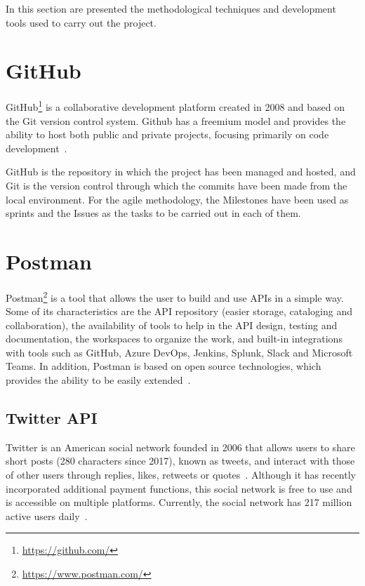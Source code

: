 
\nonzeroparskip In this section are presented the methodological techniques and development tools used to carry out the project.

\section{GitHub}

\nonzeroparskip GitHub\footnote{\url{https://github.com/}} is a collaborative development platform created in 2008 and based on the Git version control system. Github has a freemium model and provides the ability to host both public and private projects, focusing primarily on code development~\cite{wikipedia_github}.

\nonzeroparskip GitHub is the repository in which the project has been managed and hosted, and Git is the version control through which the commits have been made from the local environment. For the agile methodology, the Milestones have been used as sprints and the Issues as the tasks to be carried out in each of them.

\section{Postman}

\nonzeroparskip Postman\footnote{\url{https://www.postman.com/}} is a tool that allows the user to build and use APIs in a simple way. Some of its characteristics are the API repository (easier storage, cataloging and collaboration), the availability of tools to help in the API design, testing and documentation, the workspaces to organize the work, and built-in integrations with tools such as GitHub, Azure DevOps, Jenkins, Splunk, Slack and Microsoft Teams. In addition, Postman is based on open source technologies, which provides the ability to be easily extended~\cite{postman}.

\subsection{Twitter API}
\nonzeroparskip Twitter is an American social network founded in 2006 that allows users to share short posts (280 characters since 2017), known as tweets, and interact with those of other users through replies, likes, retweets or quotes~\cite{wikipedia_twitter}. Although it has recently incorporated additional payment functions, this social network is free to use and is accessible on multiple platforms. Currently, the social network has 217 million active users daily~\cite{variety_twitterusers}.

